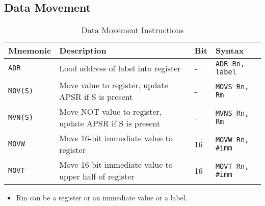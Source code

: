 \documentclass[a4paper,12pt,openany]{book}
\begin{document}
\subsection{Data Movement}
\begin{table}[H]
    \centering
    \begin{tabular}{@{}llll@{}}
        \toprule
        Mnemonic & Description & Bit & Syntax \\
        \midrule
        \texttt{ADR} & Load address of label into register & - & \texttt{ADR Rn, label} \\
        \texttt{MOV(S)} & Move value to register, update APSR if S is present & - & \texttt{MOVS Rn, Rm} \\
        \texttt{MVN(S)} & Move NOT value to register, update APSR if S is present & - & \texttt{MVNS Rn, Rm} \\
        \texttt{MOVW} & Move 16-bit immediate value to register & 16 & \texttt{MOVW Rn, \#imm} \\
        \texttt{MOVT} & Move 16-bit immediate value to upper half of register & 16 & \texttt{MOVT Rn, \#imm} \\
        \bottomrule
    \end{tabular}
    \label{tab:data_movement_instructions}
    \caption{Data Movement Instructions}
\end{table}
\begin{itemize}
    \item Rm can be a register or an immediate value or a label.
\end{itemize}
\end{document}
